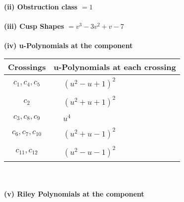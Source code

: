 \documentclass[1p]{elsarticle_modified}
\theoremstyle{definition}
\begin{document}
\flushleft \textbf{(ii) Obstruction class $= 1$}\\~\\
\flushleft \textbf{(iii) Cusp Shapes $= v^3-3 v^2+v-7$}\\~\\
\newpage\renewcommand{\arraystretch}{1}
\flushleft \textbf{(iv) u-Polynomials at the component}\newline \\
\begin{tabular}{m{50pt}|m{274pt}}
Crossings & \hspace{64pt}u-Polynomials at each crossing \\
\hline $$\begin{aligned}c_{1},c_{4},c_{5}\end{aligned}$$&$\begin{aligned}
&(u^2- u+1)^2
\end{aligned}$\\
\hline $$\begin{aligned}c_{2}\end{aligned}$$&$\begin{aligned}
&(u^2+u+1)^2
\end{aligned}$\\
\hline $$\begin{aligned}c_{3},c_{8},c_{9}\end{aligned}$$&$\begin{aligned}
&u^4
\end{aligned}$\\
\hline $$\begin{aligned}c_{6},c_{7},c_{10}\end{aligned}$$&$\begin{aligned}
&(u^2+u-1)^2
\end{aligned}$\\
\hline $$\begin{aligned}c_{11},c_{12}\end{aligned}$$&$\begin{aligned}
&(u^2- u-1)^2
\end{aligned}$\\
\hline
\end{tabular}\\~\\
\newpage\renewcommand{\arraystretch}{1}
\flushleft \textbf{(v) Riley Polynomials at the component}\newline \\
\end{document}
